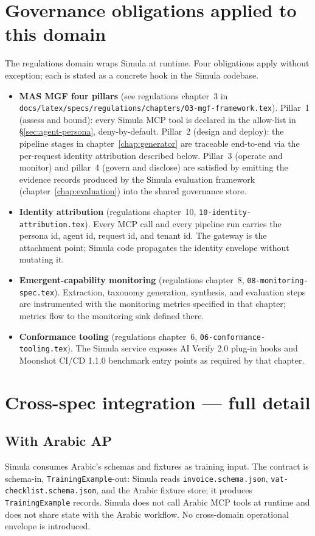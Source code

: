 \section{Governance obligations applied to this domain}
\label{sec:agent-governance}
The regulations domain wraps Simula at runtime. Four obligations
apply without exception; each is stated as a concrete hook in the
Simula codebase.

\begin{itemize}
  \item \textbf{MAS MGF four pillars} (see regulations
    chapter~3 in
    \texttt{docs/latex/specs/regulations/chapters/03-mgf-framework.tex}).
    Pillar~1 (assess and bound): every Simula MCP tool is declared
    in the allow-list in \S\ref{sec:agent-persona}, deny-by-default.
    Pillar~2 (design and deploy): the pipeline stages in
    chapter~\ref{chap:generator} are traceable end-to-end via the
    per-request identity attribution described below. Pillar~3
    (operate and monitor) and pillar~4 (govern and disclose) are
    satisfied by emitting the evidence records produced by the
    Simula evaluation framework (chapter~\ref{chap:evaluation}) into
    the shared governance store.
  \item \textbf{Identity attribution} (regulations chapter~10,
    \texttt{10-identity-attribution.tex}). Every MCP call and every
    pipeline run carries the persona id, agent id, request id, and
    tenant id. The gateway is the attachment point; Simula code
    propagates the identity envelope without mutating it.
  \item \textbf{Emergent-capability monitoring} (regulations
    chapter~8, \texttt{08-monitoring-spec.tex}). Extraction,
    taxonomy generation, synthesis, and evaluation steps are
    instrumented with the monitoring metrics specified in that
    chapter; metrics flow to the monitoring sink defined there.
  \item \textbf{Conformance tooling} (regulations chapter~6,
    \texttt{06-conformance-tooling.tex}). The Simula service
    exposes AI Verify 2.0 plug-in hooks and Moonshot CI/CD 1.1.0
    benchmark entry points as required by that chapter.
\end{itemize}

\section{Cross-spec integration --- full detail}
\label{sec:agent-integration}

\subsection{With Arabic AP}
Simula consumes Arabic's schemas and fixtures as training input. The
contract is schema-in, \texttt{TrainingExample}-out: Simula reads
\texttt{invoice.schema.json}, \texttt{vat-checklist.schema.json}, and
the Arabic fixture store; it produces \texttt{TrainingExample}
records. Simula does not call Arabic MCP tools at runtime and does
not share state with the Arabic workflow. No cross-domain
operational envelope is introduced.

